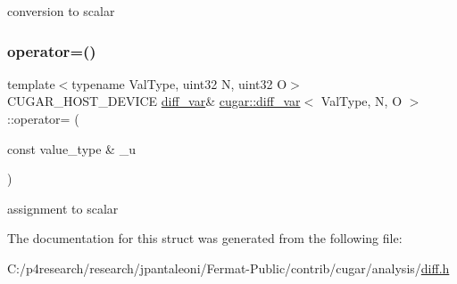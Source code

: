 conversion to scalar \mbox{\label{structcugar_1_1diff__var_a57e8d8d3aa5e039c93ebf2c165dd7516}} 
\subsubsection{\texorpdfstring{operator=()}{operator=()}}
{\footnotesize\ttfamily template$<$typename Val\+Type, uint32 N, uint32 O$>$ \\
C\+U\+G\+A\+R\+\_\+\+H\+O\+S\+T\+\_\+\+D\+E\+V\+I\+CE \hyperlink{structcugar_1_1diff__var}{diff\+\_\+var}\& \hyperlink{structcugar_1_1diff__var}{cugar\+::diff\+\_\+var}$<$ Val\+Type, N, O $>$\+::operator= (\begin{DoxyParamCaption}\item[{const value\+\_\+type \&}]{\+\_\+u }\end{DoxyParamCaption})\hspace{0.3cm}{\ttfamily [inline]}}

assignment to scalar 

The documentation for this struct was generated from the following file\+:\begin{DoxyCompactItemize}
\item 
C\+:/p4research/research/jpantaleoni/\+Fermat-\/\+Public/contrib/cugar/analysis/\hyperlink{diff_8h}{diff.\+h}\end{DoxyCompactItemize}
